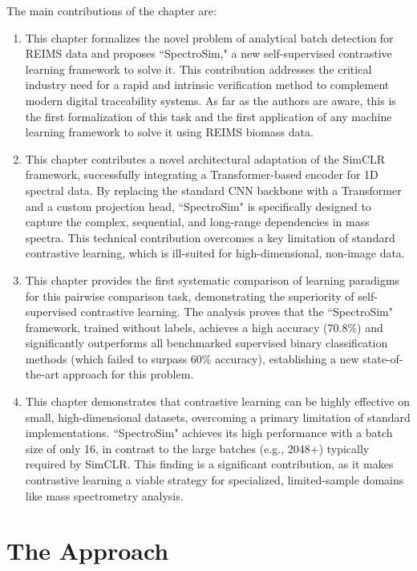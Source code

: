 The main contributions of the chapter are:

\begin{enumerate}
    \item This chapter formalizes the novel problem of analytical batch detection for REIMS data and proposes ``SpectroSim," a new self-supervised contrastive learning framework to solve it. This contribution addresses the critical industry need for a rapid and intrinsic verification method to complement modern digital traceability systems. As far as the authors are aware, this is the first formalization of this task and the first application of any machine learning framework to solve it using REIMS biomass data.
    
    \item This chapter contributes a novel architectural adaptation of the SimCLR framework, successfully integrating a Transformer-based encoder for 1D spectral data. By replacing the standard CNN backbone with a Transformer and a custom projection head, ``SpectroSim" is specifically designed to capture the complex, sequential, and long-range dependencies in mass spectra. This technical contribution overcomes a key limitation of standard contrastive learning, which is ill-suited for high-dimensional, non-image data.
    
    \item This chapter provides the first systematic comparison of learning paradigms for this pairwise comparison task, demonstrating the superiority of self-supervised contrastive learning. The analysis proves that the ``SpectroSim" framework, trained without labels, achieves a high accuracy (70.8\%) and significantly outperforms all benchmarked supervised binary classification methods (which failed to surpass 60\% accuracy), establishing a new state-of-the-art approach for this problem.
    
    \item This chapter demonstrates that contrastive learning can be highly effective on small, high-dimensional datasets, overcoming a primary limitation of standard implementations. ``SpectroSim" achieves its high performance with a batch size of only 16, in contrast to the large batches (e.g., 2048+) typically required by SimCLR. This finding is a significant contribution, as it makes contrastive learning a viable strategy for specialized, limited-sample domains like mass spectrometry analysis.
\end{enumerate}

\section{The Approach}
\label{sec:method}

